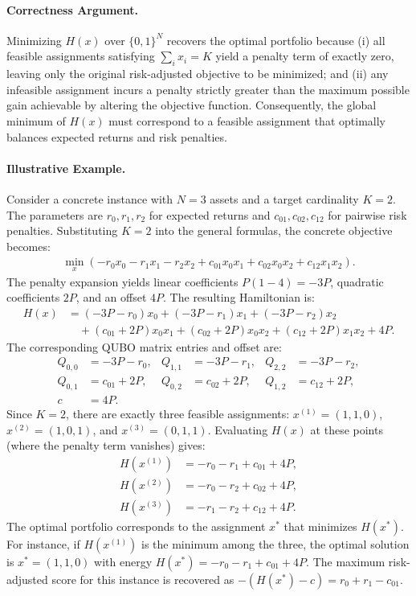 \documentclass[12pt]{article}
\begin{document}
\paragraph{Correctness Argument.}
Minimizing $H(x)$ over $\{0,1\}^N$ recovers the optimal portfolio because (i) all feasible assignments satisfying $\sum_{i} x_i = K$ yield a penalty term of exactly zero, leaving only the original risk-adjusted objective to be minimized; and (ii) any infeasible assignment incurs a penalty strictly greater than the maximum possible gain achievable by altering the objective function. Consequently, the global minimum of $H(x)$ must correspond to a feasible assignment that optimally balances expected returns and risk penalties.

\paragraph{Illustrative Example.}
Consider a concrete instance with $N=3$ assets and a target cardinality $K=2$. The parameters are $r_0, r_1, r_2$ for expected returns and $c_{01}, c_{02}, c_{12}$ for pairwise risk penalties. Substituting $K=2$ into the general formulas, the concrete objective becomes:
\begin{align}
  \min_{x} \left( -r_0 x_0 - r_1 x_1 - r_2 x_2 + c_{01} x_0 x_1 + c_{02} x_0 x_2 + c_{12} x_1 x_2 \right).
\end{align}
The penalty expansion yields linear coefficients $P(1-4) = -3P$, quadratic coefficients $2P$, and an offset $4P$. The resulting Hamiltonian is:
\begin{align}
  H(x) &= (-3P - r_0)x_0 + (-3P - r_1)x_1 + (-3P - r_2)x_2 \nonumber \\
  &\quad + (c_{01} + 2P)x_0 x_1 + (c_{02} + 2P)x_0 x_2 + (c_{12} + 2P)x_1 x_2 + 4P.
\end{align}
The corresponding QUBO matrix entries and offset are:
\begin{align}
  Q_{0,0} &= -3P - r_0, & Q_{1,1} &= -3P - r_1, & Q_{2,2} &= -3P - r_2, \\
  Q_{0,1} &= c_{01} + 2P, & Q_{0,2} &= c_{02} + 2P, & Q_{1,2} &= c_{12} + 2P, \\
  c &= 4P.
\end{align}
Since $K=2$, there are exactly three feasible assignments: $x^{(1)} = (1,1,0)$, $x^{(2)} = (1,0,1)$, and $x^{(3)} = (0,1,1)$. Evaluating $H(x)$ at these points (where the penalty term vanishes) gives:
\begin{align}
  H(x^{(1)}) &= -r_0 - r_1 + c_{01} + 4P, \\
  H(x^{(2)}) &= -r_0 - r_2 + c_{02} + 4P, \\
  H(x^{(3)}) &= -r_1 - r_2 + c_{12} + 4P.
\end{align}
The optimal portfolio corresponds to the assignment $x^*$ that minimizes $H(x^*)$. For instance, if $H(x^{(1)})$ is the minimum among the three, the optimal solution is $x^* = (1,1,0)$ with energy $H(x^*) = -r_0 - r_1 + c_{01} + 4P$. The maximum risk-adjusted score for this instance is recovered as $-(H(x^*) - c) = r_0 + r_1 - c_{01}$.
\end{document}
